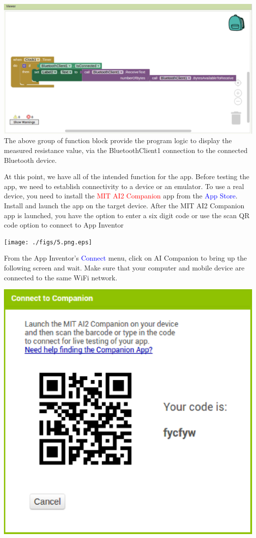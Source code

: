 \documentclass[journal,12pt,twocolumn]{IEEEtran}
\begin{document}
\includegraphics[width=\columnwidth]{./figs/12.png.eps}
\\
The above group of function block provide the program logic to display the measured resistance value, via the BluetoothClient1 connection to the connected Bluetooth device.
\begin{problem}
At this point, we have all of the intended function for the app. Before testing the app, we need to establish connectivity to a device or an emulator. To use a real device, you need to install the \textcolor{red}{MIT AI2 Companion} app from the \textcolor{blue}{App Store}. Install and launch the app on the target device.  After the MIT AI2 Companion app is launched, you have the option to enter a six digit code or use the scan QR code option to connect to App Inventor
\end{problem}
\texttt{[image: ./figs/5.png.eps]}
\begin{problem}
From the App Inventor's \textcolor{blue}{Connect} menu, click on AI Companion to bring up the following screen and wait. Make sure that your computer and mobile device are connected to the same WiFi network.
\end{problem}
%
\includegraphics[width=\columnwidth]{./figs/13.png.eps}
\end{document}
